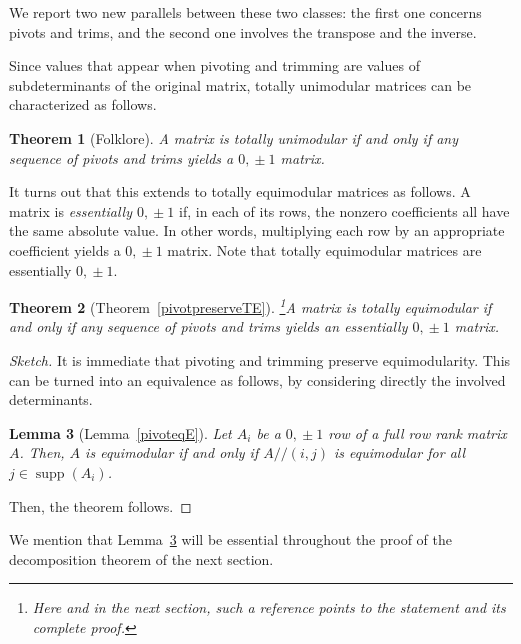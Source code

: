 \documentclass[11pt,a4paper]{amsart}
\renewcommand*{\geq}{\geqslant}
\theoremstyle{plain}
\newtheorem{theorem}{Theorem}[section]%
\newtheorem{lemma}[theorem]{Lemma}
\theoremstyle{definition}
\DeclareMathOperator{\supp}{supp}
\newcommand{\trim}{/\!\!/}
\begin{document}
We report two new parallels between these two classes: the first one concerns pivots and trims, and the second one involves the transpose and the inverse.

\medskip

Since values that appear when pivoting and trimming are values of subdeterminants of the original matrix, totally unimodular matrices can be characterized as follows.

\begin{theorem}[Folklore]\label{pivotTU}
	A matrix is totally unimodular if and only if any sequence of pivots and trims yields a $0,\!\pm1$ matrix.
\end{theorem}

It turns out that this extends to totally equimodular matrices as follows.
A matrix is {\em essentially $0,\!\pm1$} if, in each of its rows, the nonzero coefficients all have the same absolute value.
In other words, multiplying each row by an appropriate coefficient yields a $0,\!\pm1$ matrix.
Note that totally equimodular matrices are essentially $0,\!\pm1$.

%

\begin{theorem}[Theorem~\ref{pivotpreserveTE}]\footnote{Here and in the next section, such a reference points to the statement and its complete proof.}\label{theorem:pivot_TE}
	A matrix is totally equimodular if and only if any sequence of pivots and trims yields an essentially $0,\!\pm1$ matrix.
\end{theorem}
\begin{proof}[Sketch]
	It is immediate that pivoting and trimming preserve equimodularity.
	This can be turned into an equivalence as follows, by considering directly the involved determinants.
	\begin{lemma}[Lemma~\ref{pivoteqE}]\label{lemma:trim_E}
		Let $A_i$ be a $0,\!\pm1$ row of a full row rank matrix $A$.
		Then, $A$ is equimodular if and only if $A\trim(i,j)$ is equimodular for all $j\in\supp(A_i)$.
	\end{lemma}
	Then, the theorem follows.
	\end{proof}
We mention that Lemma~\ref{lemma:trim_E} will be essential throughout the proof of the decomposition theorem of the next section.
\end{document}
